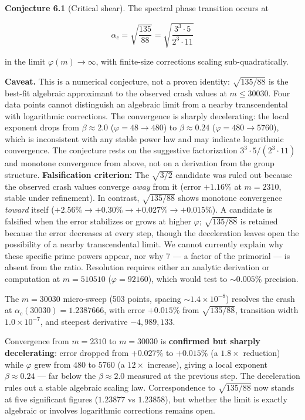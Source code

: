 \documentclass[11pt,letterpaper]{article}
\theoremstyle{definition}
\theoremstyle{remark}
\begin{document}
\textbf{Conjecture 6.1} (Critical shear). The spectral phase transition occurs at

\[\alpha_c = \sqrt{\frac{135}{88}} = \sqrt{\frac{3^3 \cdot 5}{2^3 \cdot 11}}\]

in the limit $\varphi(m) \to \infty$, with finite-size corrections scaling sub-quadratically.

\textbf{Caveat.} This is a numerical conjecture, not a proven identity: $\sqrt{135/88}$ is the best-fit algebraic approximant to the observed crash values at $m \leq 30030$. Four data points cannot distinguish an algebraic limit from a nearby transcendental with logarithmic corrections. The convergence is sharply decelerating: the local exponent drops from $\beta \approx 2.0$ ($\varphi = 48 \to 480$) to $\beta \approx 0.24$ ($\varphi = 480 \to 5760$), which is inconsistent with any stable power law and may indicate logarithmic convergence. The conjecture rests on the suggestive factorization $3^3 \cdot 5 / (2^3 \cdot 11)$ and monotone convergence from above, not on a derivation from the group structure. \textbf{Falsification criterion:} The $\sqrt{3/2}$ candidate was ruled out because the observed crash values converge \emph{away} from it (error $+1.16\%$ at $m = 2310$, stable under refinement). In contrast, $\sqrt{135/88}$ shows monotone convergence \emph{toward} itself ($+2.56\% \to +0.30\% \to +0.027\% \to +0.015\%$). A candidate is falsified when the error stabilizes or grows at higher $\varphi$; $\sqrt{135/88}$ is retained because the error decreases at every step, though the deceleration leaves open the possibility of a nearby transcendental limit. We cannot currently explain why these specific prime powers appear, nor why 7 --- a factor of the primorial --- is absent from the ratio. Resolution requires either an analytic derivation or computation at $m = 510510$ ($\varphi = 92160$), which would test to $\sim 0.005\%$ precision.

The $m = 30030$ micro-sweep (503 points, spacing $\sim 1.4 \times 10^{-8}$) resolves the crash at $\alpha_c(30030) = 1.2387666$, with error $+0.015\%$ from $\sqrt{135/88}$, transition width $1.0 \times 10^{-7}$, and steepest derivative $-4{,}989{,}133$.

Convergence from $m = 2310$ to $m = 30030$ is \textbf{confirmed but sharply decelerating}: error dropped from $+0.027\%$ to $+0.015\%$ (a $1.8\times$ reduction) while $\varphi$ grew from 480 to 5760 (a $12\times$ increase), giving a local exponent $\beta \approx 0.24$ --- far below the $\beta \approx 2.0$ measured at the previous step. The deceleration rules out a stable algebraic scaling law. Correspondence to $\sqrt{135/88}$ now stands at five significant figures ($1.23877$ vs $1.23858$), but whether the limit is exactly algebraic or involves logarithmic corrections remains open.
\end{document}
